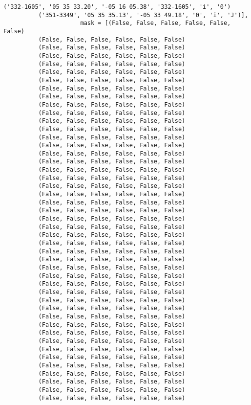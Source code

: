 \documentclass{article}
\begin{document}
\begin{Verbatim}[commandchars=\\\{\}]
          ('332-1605', '05 35 33.20', '-05 16 05.38', '332-1605', 'i', '0')
          ('351-3349', '05 35 35.13', '-05 33 49.18', '0', 'i', 'J')],
                      mask = [(False, False, False, False, False, False)
          (False, False, False, False, False, False)
          (False, False, False, False, False, False)
          (False, False, False, False, False, False)
          (False, False, False, False, False, False)
          (False, False, False, False, False, False)
          (False, False, False, False, False, False)
          (False, False, False, False, False, False)
          (False, False, False, False, False, False)
          (False, False, False, False, False, False)
          (False, False, False, False, False, False)
          (False, False, False, False, False, False)
          (False, False, False, False, False, False)
          (False, False, False, False, False, False)
          (False, False, False, False, False, False)
          (False, False, False, False, False, False)
          (False, False, False, False, False, False)
          (False, False, False, False, False, False)
          (False, False, False, False, False, False)
          (False, False, False, False, False, False)
          (False, False, False, False, False, False)
          (False, False, False, False, False, False)
          (False, False, False, False, False, False)
          (False, False, False, False, False, False)
          (False, False, False, False, False, False)
          (False, False, False, False, False, False)
          (False, False, False, False, False, False)
          (False, False, False, False, False, False)
          (False, False, False, False, False, False)
          (False, False, False, False, False, False)
          (False, False, False, False, False, False)
          (False, False, False, False, False, False)
          (False, False, False, False, False, False)
          (False, False, False, False, False, False)
          (False, False, False, False, False, False)
          (False, False, False, False, False, False)
          (False, False, False, False, False, False)
          (False, False, False, False, False, False)
          (False, False, False, False, False, False)
          (False, False, False, False, False, False)
          (False, False, False, False, False, False)
          (False, False, False, False, False, False)
          (False, False, False, False, False, False)
          (False, False, False, False, False, False)
          (False, False, False, False, False, False)
          (False, False, False, False, False, False)

\end{Verbatim}
\end{document}
